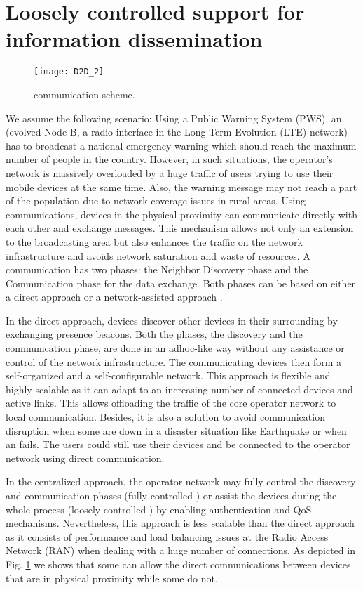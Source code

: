 \documentclass[review]{elsarticle}
\begin{document}
\section{Loosely controlled  support for information dissemination}\label{sec:D2Dscenario}
\begin{figure}\centering
    \texttt{[image: D2D\_2]}
    \caption{ communication scheme.}
    \label{fig:d2d}
\end{figure}
We assume the following  scenario: Using a Public Warning System (PWS), an  (evolved Node B, a radio interface in the Long Term Evolution (LTE) network) has to broadcast a national emergency warning which should reach the maximum number of people in the country. However, in such situations, the operator's network is massively overloaded by a huge traffic of users trying to use their mobile devices at the same time. Also, the warning message may not reach a part of the population due to network coverage issues in rural areas.
Using  communications, devices in the physical proximity can communicate directly with each other and exchange messages. This mechanism allows not only an extension to the broadcasting area but also enhances the traffic on the network infrastructure and avoids network saturation and waste of resources. A  communication has two phases: the Neighbor Discovery phase and the Communication phase for the data exchange. Both phases can be based on either a direct approach or a network-assisted approach \cite{Fodor2102,Lei2012,3GPP13,3GPP14,Toukabri14}.

In the direct  approach, devices discover other devices in their surrounding by exchanging presence beacons. Both the phases, the discovery and the communication phase, are done in an adhoc-like way without any assistance or control of the network infrastructure. The communicating devices then form a self-organized and a self-configurable network. This approach is flexible and highly scalable as it can adapt to an increasing number of connected devices and active  links. This allows offloading the traffic of the core operator network to local  communication. Besides, it is also a solution to avoid communication disruption when some  are down in a disaster situation like Earthquake or when an  fails. The users could still use their devices and be connected to the operator network using direct communication.

In the centralized  approach, the operator network may fully control the discovery and communication phases (fully controlled ) or assist the devices during the whole  process (loosely controlled ) by enabling authentication and QoS mechanisms. Nevertheless, this approach is less scalable than the direct approach as it consists of performance and load balancing issues at the Radio Access Network (RAN) when dealing with a huge number of  connections. As depicted in Fig. \ref{fig:d2d} we shows that some  can allow the direct communications between devices that are in physical proximity while some do not.
\end{document}
